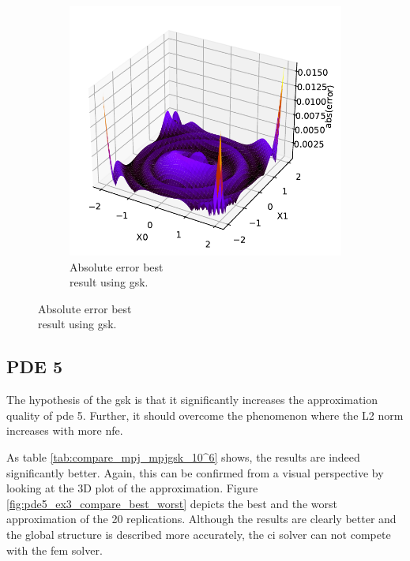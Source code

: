 \documentclass[./\jobname.tex]{subfiles}
\begin{document}
\begin{figure}[H]
\begin{subfigure}[b]{0.4\linewidth}
		\includegraphics[width=1\textwidth]{../../code/experiments/experiment_3/pde0b_ex3_abs_error.pdf}
		\caption{Absolute error best\\ result using \gls{gsk}. }
		\label{fig:pde0b_ex3_abs_error}
	\end{subfigure}%
	\label{fig:compare_abs_error_non_adaptive}
\end{figure}

\subsection{PDE 5}

The hypothesis of the \gls{gsk} is that it significantly increases the approximation quality of \gls{pde} 5. Further, it should overcome the phenomenon where the L2 norm increases with more \gls{nfe}. 

As table \ref{tab:compare_mpj_mpjgsk_10^6} shows, the results are indeed significantly better. Again, this can be confirmed from a visual perspective by looking at the 3D plot of the approximation. Figure \ref{fig:pde5_ex3_compare_best_worst} depicts the best and the worst approximation of the 20 replications. Although the results are clearly better and the global structure is described more accurately, the \gls{ci} solver can not compete with the \gls{fem} solver. 
\end{document}
